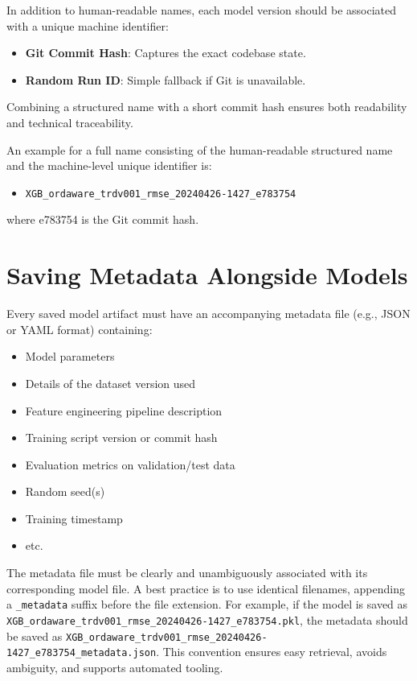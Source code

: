 \documentclass[12pt,openany]{book}
\begin{document}
In addition to human-readable names, each model version should be associated with a unique machine identifier:
\begin{itemize}
    \item \textbf{Git Commit Hash}: Captures the exact codebase state.
    \item \textbf{Random Run ID}: Simple fallback if Git is unavailable.
\end{itemize}
Combining a structured name with a short commit hash ensures both readability and technical traceability. \newline

An example for a full name consisting of the human-readable structured name and the machine-level unique identifier is:
\begin{itemize}
    \item \texttt{XGB\_ordaware\_trdv001\_rmse\_20240426-1427\_e783754}
\end{itemize}

where e783754 is the Git commit hash.



\section{Saving Metadata Alongside Models}

Every saved model artifact must have an accompanying metadata file (e.g., JSON or YAML format) containing:

\begin{itemize}
    \item Model parameters
    \item Details of the dataset version used
    \item Feature engineering pipeline description
    \item Training script version or commit hash
    \item Evaluation metrics on validation/test data
    \item Random seed(s)
    \item Training timestamp
    \item etc.
\end{itemize}

The metadata file must be clearly and unambiguously associated with its corresponding model file. A best practice is to use identical filenames, appending a \texttt{\_metadata} suffix before the file extension. For example, if the model is saved as \texttt{XGB\_ordaware\_trdv001\_rmse\_20240426-1427\_e783754.pkl}, the metadata should be saved as \texttt{XGB\_ordaware\_trdv001\_rmse\_20240426-1427\_e783754\_metadata.json}. This convention ensures easy retrieval, avoids ambiguity, and supports automated tooling.
\end{document}
